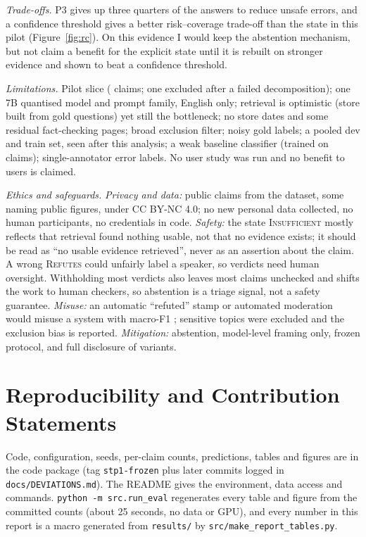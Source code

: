 \documentclass[acmlarge]{acmart}
\newcommand{\evs}[1]{\textsc{#1}}
\newcommand{\runin}[1]{\par\addvspace{4pt}\noindent\hspace{\parindent}\textit{#1}\hspace{0.45em}\ignorespaces}
\begin{document}
\runin{Trade-offs.} P3 gives up three quarters of the answers to reduce unsafe errors, and a confidence threshold gives a better risk--coverage trade-off than the state in this pilot (Figure~\ref{fig:rc}). On this evidence I would keep the abstention mechanism, but not claim a benefit for the explicit state until it is rebuilt on stronger evidence and shown to beat a confidence threshold.

\runin{Limitations.} Pilot slice (\nPool{} claims; one excluded after a failed decomposition); one 7B quantised model and prompt family, English only; retrieval is optimistic (store built from gold questions) yet still the bottleneck; no store dates and some residual fact-checking pages; broad exclusion filter; noisy gold labels; a pooled dev and train set, seen after this analysis; a weak baseline classifier (trained on \nTune{} claims); single-annotator error labels. No user study was run and no benefit to users is claimed.

\runin{Ethics and safeguards.} \emph{Privacy and data:} public claims from the dataset, some naming public figures, under CC BY-NC 4.0; no new personal data collected, no human participants, no credentials in code. \emph{Safety:} the state \evs{Insufficient} mostly reflects that retrieval found nothing usable, not that no evidence exists; it should be read as ``no usable evidence retrieved'', never as an assertion about the claim. A wrong \evs{Refutes} could unfairly label a speaker, so verdicts need human oversight. Withholding most verdicts also leaves most claims unchecked and shifts the work to human checkers, so abstention is a triage signal, not a safety guarantee. \emph{Misuse:} an automatic ``refuted'' stamp or automated moderation would misuse a system with macro-F1 \mfPool; sensitive topics were excluded and the exclusion bias is reported. \emph{Mitigation:} abstention, model-level framing only, frozen protocol, and full disclosure of variants.

\section{Reproducibility and Contribution Statements}\label{sec:repro}
Code, configuration, seeds, per-claim counts, predictions, tables and figures are in the code package (tag \texttt{stp1-frozen} plus later commits logged in \texttt{docs/DEVIATIONS.md}). The README gives the environment, data access and commands. \texttt{python -m src.run\_eval} regenerates every table and figure from the committed counts (about 25 seconds, no data or GPU), and every number in this report is a macro generated from \texttt{results/} by \texttt{src/make\_report\_tables.py}.
\end{document}
